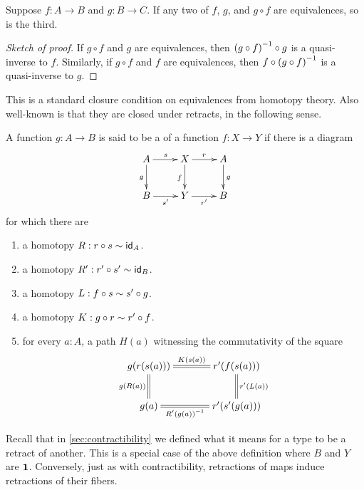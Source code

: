 \begin{thm}\label{thm:two-out-of-three}
  Suppose $f:A\to B$ and $g:B\to C$.
  If any two of $f$, $g$, and $g\circ f$ are equivalences, so is the third.
\end{thm}
\begin{proof}[Sketch of proof]
  If $g\circ f$ and $g$ are equivalences, then $\opp{(g\circ f)} \circ g$ is a quasi-inverse to $f$.
  Similarly, if $g\circ f$ and $f$ are equivalences, then $f\circ \opp{(g\circ f)}$ is a quasi-inverse to $g$.
\end{proof}

This is a standard closure condition on equivalences from homotopy theory.
Also well-known is that they are closed under retracts, in the following sense.

\begin{defn}\label{defn:retract}
A function $g:A\to B$ is said to be a 
of a function $f:X\to Y$ if there is a diagram
\begin{equation*}
  \xymatrix{
    {A} \ar[r]^{s} \ar[d]_{g}
    &
    {X} \ar[r]^{r} \ar[d]_{f}
    &
    {A} \ar[d]^{g}
    \\
    {B} \ar[r]_{s'}
    &
    {Y} \ar[r]_{r'}
    &
    {B}
  }
\end{equation*}
for which there are
\begin{enumerate}
\item a homotopy $R:r\circ s \htpy \idfunc[A]$.
\item a homotopy $R':r'\circ s' \htpy\idfunc[B]$.
\item a homotopy $L:f\circ s\htpy s'\circ g$.
\item a homotopy $K:g\circ r\htpy r'\circ f$.
\item for every $a:A$, a path $H(a)$ witnessing the commutativity of the square
\begin{equation*}
  \xymatrix@C=3pc{
    {g(r(s(a)))} \ar@{=}[r]^-{K(s(a))} \ar@{=}[d]_{\ap g{R(a)}}
    &
    {r'(f(s(a)))} \ar@{=}[d]^{\ap{r'}{L(a)}}
    \\
    {g(a)} \ar@{=}[r]_-{\opp{R'(g(a))}}
    &
    {r'(s'(g(a)))}
  }
\end{equation*}
\end{enumerate}
\end{defn}

Recall that in \autoref{sec:contractibility} we defined what it means for a type to be a retract of another.
This is a special case of the above definition where $B$ and $Y$ are $\unit$.
Conversely, just as with contractibility, retractions of maps induce retractions of their fibers.

